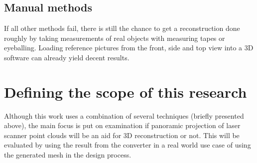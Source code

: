 \subsection{Manual methods}

If all other methods fail, there is still the chance to get a reconstruction done roughly by taking measurements of real objects with measuring tapes or eyeballing. Loading reference pictures from the front, side and top view into a 3D software can already yield decent results.

\section{Defining the scope of this research}

Although this work uses a combination of several techniques (briefly presented above), the main focus is put on examination if panoramic projection of laser scanner point clouds will be an aid for 3D reconstruction or not. This will be evaluated by using the result from the converter in a real world use case of using the generated mesh in the design process.
